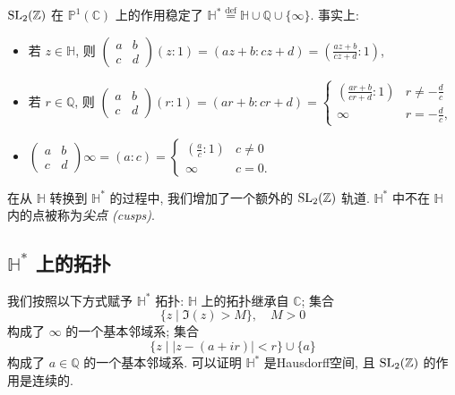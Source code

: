 $\operatorname{SL}_2(\mathbb{Z})$ 在 $\mathbb{P}^1(\mathbb{C})$ 上的作用稳定了 $\mathbb{H}^* \stackrel{\text{def}}{=} \mathbb{H} \cup \mathbb{Q} \cup \{\infty\}$. 事实上: 
\begin{itemize}
    \item 若 $z \in \mathbb{H}$, 则 $\begin{pmatrix} a & b \\ c & d \end{pmatrix} (z : 1) = (az + b : cz + d) = \left( \frac{az+b}{cz+d} : 1 \right)$, 
    \item 若 $r \in \mathbb{Q}$, 则 $\begin{pmatrix} a & b \\ c & d \end{pmatrix} (r : 1) = (ar + b : cr + d) = 
    \begin{cases} 
        \left( \frac{ar+b}{cr+d} : 1 \right) & r \neq -\frac{d}{c} \\
        \infty & r = -\frac{d}{c},
    \end{cases}$
    \item $\begin{pmatrix} a & b \\ c & d \end{pmatrix} \infty = (a : c) = 
    \begin{cases} 
        \left( \frac{a}{c} : 1 \right) & c \neq 0 \\
        \infty & c = 0.
    \end{cases}$
\end{itemize}

在从 $\mathbb{H}$ 转换到 $\mathbb{H}^*$ 的过程中, 我们增加了一个额外的 $\operatorname{SL}_2(\mathbb{Z})$ 轨道. $\mathbb{H}^*$ 中不在 $\mathbb{H}$ 内的点被称为\emph{尖点 (cusps)}. 

\subsection*{$\mathbb{H}^*$ 上的拓扑}

我们按照以下方式赋予 $\mathbb{H}^*$ 拓扑: $\mathbb{H}$ 上的拓扑继承自 $\mathbb{C}$; 
集合
\[ \{z \mid \Im(z) > M\}, \quad M > 0 \]
构成了 $\infty$ 的一个基本邻域系; 集合
\[ \{z \mid |z - (a + ir)| < r\} \cup \{a\} \]
构成了 $a \in \mathbb{Q}$ 的一个基本邻域系. 可以证明 $\mathbb{H}^*$ 是Hausdorff空间, 且 $\operatorname{SL}_2(\mathbb{Z})$ 的作用是连续的. 

